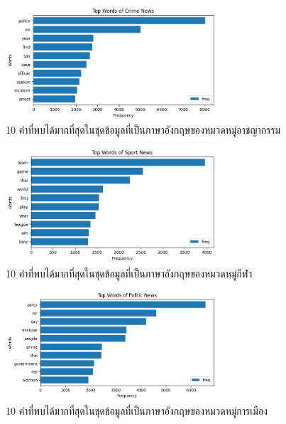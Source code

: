 \documentclass[12pt,oneside,openright,a4paper]{cpe-thai-project}
\begin{document}
\begin{itemize}
        \begin{figure}[!ht]\centering
          \includegraphics[width=0.7\textwidth]{./img/eng_stat/crime_bar.png}
          \caption{10 คำที่พบได้มากที่สุดในชุดข้อมูลที่เป็นภาษาอังกฤษของหมวดหมู่อาชญากรรม}\label{fig:crime_bar_eng}
        \end{figure}
        \newpage
        \begin{figure}[!ht]\centering
          \includegraphics[width=0.7\textwidth]{./img/eng_stat/sport_bar.png}
          \caption{10 คำที่พบได้มากที่สุดในชุดข้อมูลที่เป็นภาษาอังกฤษของหมวดหมู่กีฬา}\label{fig:sport_bar_eng}
        \end{figure}
        \begin{figure}[!ht]\centering
          \includegraphics[width=0.7\textwidth]{./img/eng_stat/polit_bar.png}
          \caption{10 คำที่พบได้มากที่สุดในชุดข้อมูลที่เป็นภาษาอังกฤษของหมวดหมู่การเมือง}\label{fig:polit_bar_eng}
        \end{figure}
        \begin{figure}[!ht]\centering

\end{figure}
\end{itemize}
\end{document}
